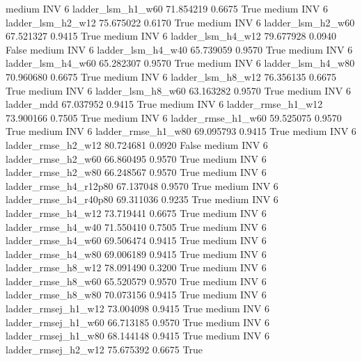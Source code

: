     medium      INV                 6      ladder_lsm_h1_w60  71.854219      0.6675    True
    medium      INV                 6      ladder_lsm_h2_w12  75.675022      0.6170    True
    medium      INV                 6      ladder_lsm_h2_w60  67.521327      0.9415    True
    medium      INV                 6      ladder_lsm_h4_w12  79.677928      0.0940   False
    medium      INV                 6      ladder_lsm_h4_w40  65.739059      0.9570    True
    medium      INV                 6      ladder_lsm_h4_w60  65.282307      0.9570    True
    medium      INV                 6      ladder_lsm_h4_w80  70.960680      0.6675    True
    medium      INV                 6      ladder_lsm_h8_w12  76.356135      0.6675    True
    medium      INV                 6      ladder_lsm_h8_w60  63.163282      0.9570    True
    medium      INV                 6             ladder_mdd  67.037952      0.9415    True
    medium      INV                 6     ladder_rmse_h1_w12  73.900166      0.7505    True
    medium      INV                 6     ladder_rmse_h1_w60  59.525075      0.9570    True
    medium      INV                 6     ladder_rmse_h1_w80  69.095793      0.9415    True
    medium      INV                 6     ladder_rmse_h2_w12  80.724681      0.0920   False
    medium      INV                 6     ladder_rmse_h2_w60  66.860495      0.9570    True
    medium      INV                 6     ladder_rmse_h2_w80  66.248567      0.9570    True
    medium      INV                 6  ladder_rmse_h4_r12p80  67.137048      0.9570    True
    medium      INV                 6  ladder_rmse_h4_r40p80  69.311036      0.9235    True
    medium      INV                 6     ladder_rmse_h4_w12  73.719441      0.6675    True
    medium      INV                 6     ladder_rmse_h4_w40  71.550410      0.7505    True
    medium      INV                 6     ladder_rmse_h4_w60  69.506474      0.9415    True
    medium      INV                 6     ladder_rmse_h4_w80  69.006189      0.9415    True
    medium      INV                 6     ladder_rmse_h8_w12  78.091490      0.3200    True
    medium      INV                 6     ladder_rmse_h8_w60  65.520579      0.9570    True
    medium      INV                 6     ladder_rmse_h8_w80  70.073156      0.9415    True
    medium      INV                 6    ladder_rmsej_h1_w12  73.004098      0.9415    True
    medium      INV                 6    ladder_rmsej_h1_w60  66.713185      0.9570    True
    medium      INV                 6    ladder_rmsej_h1_w80  68.144148      0.9415    True
    medium      INV                 6    ladder_rmsej_h2_w12  75.675392      0.6675    True
